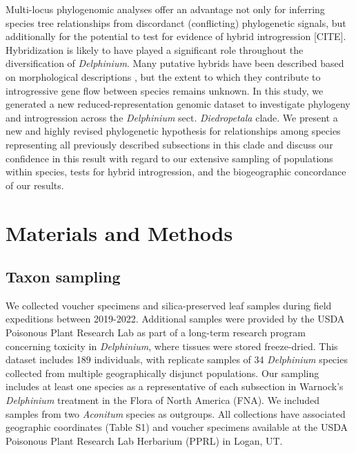 \documentclass[11pt]{article}
\begin{document}
Multi-locus phylogenomic analyses offer an advantage not only for inferring
species tree relationships from discordanct (conflicting) phylogenetic signals, 
but additionally for the potential to test for evidence of hybrid introgression
[CITE].
% 
Hybridization is likely to have played a significant role throughout the 
diversification of \emph{Delphinium}. 
Many putative hybrids have been described based on morphological descriptions 
\citep{ewan_1945, warnock_1997},
but the extent to which they contribute to introgressive gene 
flow between species remains unknown.
% 
% 
In this study, we generated a new reduced-representation genomic dataset to 
investigate phylogeny and introgression across the \emph{Delphinium} sect. 
\emph{Diedropetala} clade. 
% 
We present a new and highly revised phylogenetic hypothesis for relationships
among species representing all previously described subsections in this clade 
and discuss our confidence in this result with regard to our 
extensive sampling of populations within species, tests for hybrid 
introgression, and the biogeographic concordance of our results.


\section{Materials and Methods}

\subsection{Taxon sampling}
We collected voucher specimens and silica-preserved leaf samples during field expeditions
between 2019-2022. Additional samples were provided by the USDA Poisonous Plant Research
Lab as part of a long-term research program concerning toxicity in \emph{Delphinium}, where
tissues were stored freeze-dried.
% 
This dataset includes 189 individuals, with replicate samples of 34 \emph{Delphinium} 
species collected from multiple geographically disjunct populations. Our sampling includes
at least one species as a representative of each subsection in Warnock’s \emph{Delphinium}
treatment in the Flora of North America (FNA). 
We included samples from two \emph{Aconitum} species as outgroups.
All collections have associated geographic coordinates (Table S1) and voucher 
specimens available at the USDA Poisonous Plant Research Lab Herbarium (PPRL)
in Logan, UT.
\end{document}
